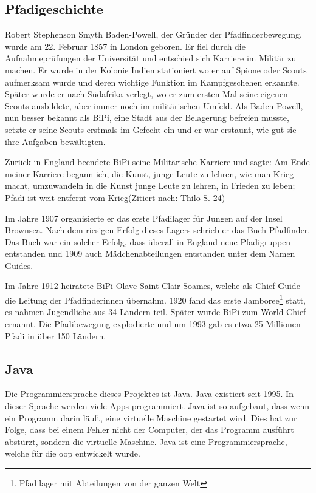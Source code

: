 \subsection*{Pfadigeschichte}
Robert Stephenson Smyth Baden-Powell, der Gründer der Pfadfinderbewegung, wurde am 22. Februar 1857 in London geboren. Er fiel durch die Aufnahmeprüfungen der Universität und entschied sich Karriere im Militär zu machen. Er wurde in der Kolonie Indien stationiert wo er auf Spione oder Scouts aufmerksam wurde und deren wichtige Funktion im Kampfgeschehen erkannte. Später wurde er nach Südafrika verlegt, wo er zum ersten Mal seine eigenen Scouts ausbildete, aber immer noch im militärischen Umfeld. Als Baden-Powell, nun besser bekannt als BiPi, eine Stadt aus der Belagerung befreien musste, setzte er seine Scouts erstmals im Gefecht ein und er war erstaunt, wie gut sie ihre Aufgaben bewältigten. \par Zurück in England beendete BiPi seine Militärische Karriere und sagte: \glqq Am Ende meiner Karriere begann ich, die Kunst, junge Leute zu lehren, wie man Krieg macht, umzuwandeln in die Kunst junge Leute zu lehren, in Frieden zu leben; Pfadi ist weit entfernt vom Krieg\grqq\cite{noauthor_thilo_2014}(Zitiert nach: Thilo S. 24) \par
Im Jahre 1907 organisierte er das erste Pfadilager für Jungen auf der Insel Brownsea. Nach dem riesigen Erfolg dieses Lagers schrieb er das Buch Pfadfinder. Das Buch war ein solcher Erfolg, dass überall in England neue Pfadigruppen entstanden und 1909 auch Mädchenabteilungen entstanden unter dem Namen Guides. \par Im Jahre 1912 heiratete BiPi Olave Saint Clair Soames, welche als Chief Guide die Leitung der Pfadfinderinnen übernahm. 1920 fand das erste Jamboree\footnote{Pfadilager mit Abteilungen von der ganzen Welt} statt, es nahmen Jugendliche aus 34 Ländern teil. Später wurde BiPi zum World Chief ernannt. Die Pfadibewegung explodierte und um 1993 gab es etwa 25 Millionen Pfadi in über 150 Ländern. 

\subsection{Java}
Die Programmiersprache dieses Projektes ist Java. Java existiert seit 1995. In dieser Sprache werden viele Apps programmiert\cite{oa_what_nodate}. Java ist so aufgebaut, dass wenn ein Programm darin läuft, eine virtuelle Maschine gestartet wird. Dies hat zur Folge, dass bei einem Fehler nicht der Computer, der das Programm ausführt abstürzt, sondern die virtuelle Maschine\cite{wikipedia-autoren_java_2024}. Java ist eine Programmiersprache, welche für die \gls{oop} entwickelt wurde. 

